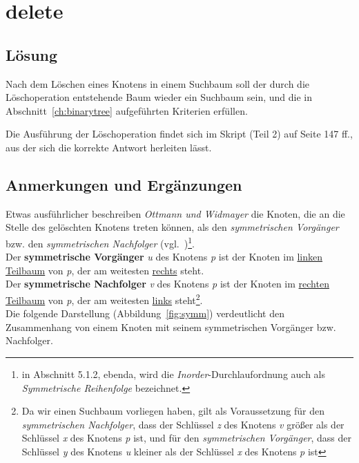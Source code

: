 \chapter{delete}

\section*{Lösung}

Nach dem Löschen eines Knotens in einem Suchbaum soll der durch die Löschoperation entstehende Baum wieder ein Suchbaum sein, und die in Abschnitt~\ref{ch:binarytree} aufgeführten Kriterien erfüllen.

Die Ausführung der Löschoperation findet sich im Skript (Teil 2) auf Seite 147 ff., aus der sich die korrekte Antwort herleiten lässt.


\section*{Anmerkungen und Ergänzungen}
Etwas ausführlicher beschreiben \textit{Ottmann und Widmayer} die Knoten, die an die Stelle des gelöschten Knotens treten können, als den \textit{symmetrischen Vorgänger} bzw. den \textit{symmetrischen Nachfolger} (vgl.~\cite[288 f.]{OW17e})\footnote{
in Abschnitt 5.1.2, ebenda, wird die \textit{Inorder}-Durchlaufordnung auch als \textit{Symmetrische Reihenfolge} bezeichnet.
}.
\\

Der \textbf{symmetrische Vorgänger} \textit{u} des Knotens \textit{p} ist der Knoten im \underline{linken Teilbaum} von \textit{p}, der am weitesten \underline{rechts} steht.
\\

Der \textbf{symmetrische Nachfolger} \textit{v} des Knotens \textit{p} ist der Knoten im \underline{rechten Teilbaum} von \textit{p}, der am weitesten \underline{links} steht\footnote{
    Da wir einen Suchbaum vorliegen haben, gilt als Voraussetzung für den \textit{symmetrischen Nachfolger}, dass der Schlüssel \textit{z} des Knotens \textit{v} größer als der Schlüssel \textit{x} des Knotens \textit{p} ist, und für den \textit{symmetrischen Vorgänger}, dass der Schlüssel \textit{y} des Knotens \textit{u}  kleiner als der Schlüssel \textit{x} des Knotens \textit{p} ist
}.
\\

Die folgende Darstellung (Abbildung~\ref{fig:symm}) verdeutlicht den Zusammenhang von einem Knoten mit seinem symmetrischen Vorgänger {bzw.} Nachfolger.

